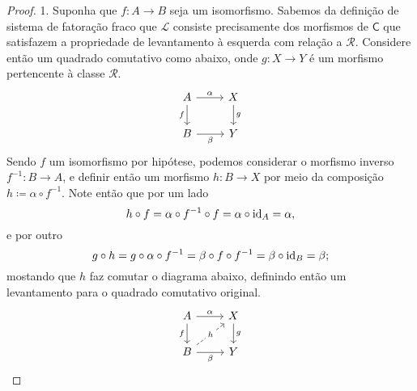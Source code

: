 
\begin{proof}
  1. Suponha que $f: A \to B$ seja um isomorfismo.
  Sabemos da definição de sistema de fatoração fraco que $\mathcal{L}$ consiste precisamente dos morfismos de $\mathsf{C}$ que satisfazem a propriedade de levantamento à esquerda com relação a $\mathcal{R}$.
  Considere então um quadrado comutativo como abaixo, onde $g: X \to Y$ é um morfismo pertencente à classe $\mathcal{R}$.
  \begin{displaymath}
    \begin{tikzcd}
      A
      \arrow[r, "\alpha"]
      \arrow[d, "f" swap]
      & X
      \arrow[d, "g"]
      \\ B
      \arrow[r, "\beta" swap]
      & Y
    \end{tikzcd}
  \end{displaymath}
  Sendo $f$ um isomorfismo por hipótese, podemos considerar o morfismo inverso $f^{-1}: B \to A$, e definir então um morfismo $h: B \to X$ por meio da composição $h \coloneqq \alpha \circ f^{-1}$.
  Note então que por um lado
  \begin{displaymath}
    h \circ f
    = \alpha \circ f^{-1} \circ f
    = \alpha \circ \mathrm{id}_{A}
    = \alpha,
  \end{displaymath}
  e por outro
  \begin{displaymath}
    g \circ h
    = g \circ \alpha \circ f^{-1}
    = \beta \circ f \circ f^{-1}
    = \beta \circ \mathrm{id}_{B}
    = \beta;
  \end{displaymath}
  mostando que $h$ faz comutar o diagrama abaixo, definindo então um levantamento para o quadrado comutativo original.
  \begin{displaymath}
    \begin{tikzcd}
      A
      \arrow[r, "\alpha"]
      \arrow[d, "f" swap]
      & X
      \arrow[d, "g"]
      \\ B
      \arrow[r, "\beta" swap]
      \arrow[ru, dashed, "h" description]
      & Y
    \end{tikzcd}
  \end{displaymath}


\end{proof}
